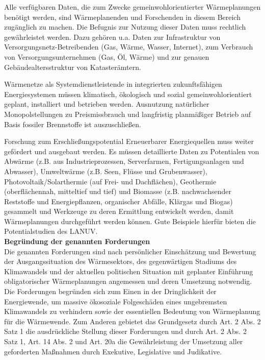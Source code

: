 		Alle verfügbaren Daten, die zum Zwecke gemeinwohlorientierter Wärmeplanungen benötigt werden, sind Wärmeplanenden und Forschenden in diesem Bereich zugänglich zu machen. Die Befugnis zur Nutzung dieser Daten muss rechtlich gewährleistet werden. Dazu gehören u.a. Daten zur Infrastruktur von Versorgungsnetz-Betreibenden (Gas, Wärme, Wasser, Internet), zum Verbrauch von Versorgungsunternehmen (Gas, Öl, Wärme) und zur genauen Gebäudealtersstruktur von Katasterämtern. 
		
		Wärmenetze als Systemdienstleistende in integrierten zukunftsfähigen Energiesystemen müssen klimatisch, ökologisch und sozial gemeinwohlorientiert geplant, installiert und betrieben werden. Ausnutzung natürlicher Monopolstellungen zu Preismissbrauch und langfristig planmäßiger Betrieb auf Basis fossiler Brennstoffe ist auszuschließen. 
		
		Forschung zum Erschließungspotential Erneuerbarer Energiequellen muss weiter gefördert und ausgebaut werden. Es müssen detaillierte Daten zu Potentialen von Abwärme (z.B. aus Industrieprozessen, Serverfarmen, Fertigungsanlagen und Abwasser), Umweltwärme (z.B. Seen, Flüsse und Grubenwasser), Photovoltaik/Solarthermie (auf Frei- und Dachflächen), Geothermie (oberflächennah, mitteltief und tief) und Biomasse (z.B. nachwachsender Reststoffe und Energiepflanzen, organischer Abfälle, Klärgas und Biogas) gesammelt und Werkzeuge zu deren Ermittlung entwickelt werden, damit Wärmeplanungen durchgeführt werden können. Gute Beispiele hierfür bieten die Potentialstudien des LANUV.\\
		
		\textbf{Begründung der genannten Forderungen}\\ 
		Die genannten Forderungen sind nach persönlicher Einschätzung und Bewertung der Ausgangssituation des Wärmesektors, des gegenwärtigen Stadiums des Klimawandels und der aktuellen politischen Situation mit geplanter Einführung obligatorischer Wärmeplanungen angemessen und deren Umsetzung notwendig. Die Forderungen begründen sich zum Einen in der Dringlichkeit der Energiewende, um massive ökosoziale Folgeschäden eines ungebremsten Klimawandels zu verhindern sowie der essentiellen Bedeutung von Wärmeplanung für die Wärmewende. Zum Anderen gebietet das Grundgesetz durch Art. 2 Abs. 2 Satz 1 die ausdrückliche Stellung dieser Forderungen und durch Art. 2 Abs. 2 Satz 1, Art. 14 Abs. 2 und Art. 20a die Gewährleistung der Umsetzung aller geforderten Maßnahmen durch Exekutive, Legislative und Judikative. \\
		
